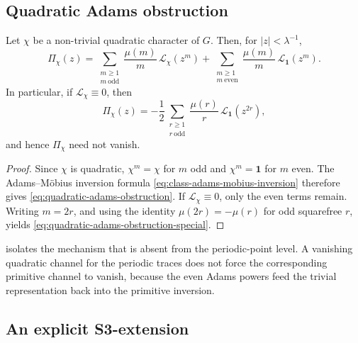 \subsection{Quadratic Adams obstruction}

\begin{theorem}
  \label{thm:quadratic-adams-obstruction}
  Let \(\chi\) be a non-trivial quadratic character of \(G\). Then, for
  \(|z|<\lambda^{-1}\),
  \begin{equation}\label{eq:quadratic-adams-obstruction}
    \Pi_\chi(z)
    =
    \sum_{\substack{m\ge 1\\ m\ \mathrm{odd}}}
      \frac{\mu(m)}{m}\,\mathcal L_\chi(z^m)
    +
    \sum_{\substack{m\ge 1\\ m\ \mathrm{even}}}
      \frac{\mu(m)}{m}\,\mathcal L_{\mathbf 1}(z^m).
  \end{equation}
  In particular, if \(\mathcal L_\chi\equiv 0\), then
  \begin{equation}\label{eq:quadratic-adams-obstruction-special}
    \Pi_\chi(z)
    =
    -\frac{1}{2}
      \sum_{\substack{r\ge 1\\ r\ \mathrm{odd}}}
        \frac{\mu(r)}{r}\,
        \mathcal L_{\mathbf 1}(z^{2r}),
  \end{equation}
  and hence \(\Pi_\chi\) need not vanish.
\end{theorem}

\begin{proof}
  Since \(\chi\) is quadratic, \(\chi^m=\chi\) for \(m\) odd and
  \(\chi^m=\mathbf 1\) for \(m\) even. The Adams--M\"obius inversion
  formula \eqref{eq:class-adams-mobius-inversion} therefore gives
  \eqref{eq:quadratic-adams-obstruction}. If \(\mathcal L_\chi\equiv 0\),
  only the even terms remain. Writing \(m=2r\), and using the identity
  \(\mu(2r)=-\mu(r)\) for odd squarefree \(r\), yields
  \eqref{eq:quadratic-adams-obstruction-special}.
\end{proof}

\begin{remark}
   isolates the mechanism that is
  absent from the periodic-point level. A vanishing quadratic channel
  for the periodic traces does not force the corresponding primitive
  channel to vanish, because the even Adams powers feed the trivial
  representation back into the primitive inversion.
\end{remark}

\subsection{An explicit S3-extension}

